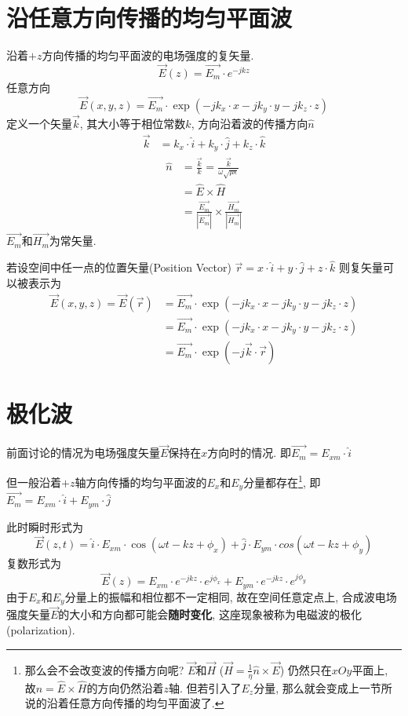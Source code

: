 \documentclass[a4paper]{report}
\begin{document}
\section{沿任意方向传播的均匀平面波}
沿着$+z$方向传播的均匀平面波的电场强度的复矢量. 
$$\vec{E}(z)=\vec{E _m}\cdot e^{-jkz}  $$
任意方向
$$\vec{E}(x,y,z)=\vec{E _m}\cdot \exp(-jk_x\cdot x-jk_y\cdot y-jk_z\cdot z)  $$
定义一个矢量$\vec{k}$, 其大小等于相位常数$k$, 方向沿着波的传播方向$\hat{n}$
\begin{align*}
    \vec{k}&=k_x\cdot\hat{i} +k_y\cdot \hat{j} +k_z\cdot\hat{k}
\end{align*}
\begin{align*}
    \hat{n}&=\frac{\vec{k}}{k}=\frac{\vec{k}}{\omega\sqrt{\mu\epsilon}}\\
    &=\hat{E}\times\hat{H}\\
    &=\frac{\vec{E_m}}{|\vec{E_m}|} \times \frac{\vec{H_m}}{|\vec{H_m}|}
\end{align*}
$\vec{E_m}$和$\vec{H_m}$为常矢量. 
\par 若设空间中任一点的位置矢量(Position Vector) $\vec{r}=x\cdot\hat{i} +y\cdot \hat{j} +z\cdot\hat{k}$
则复矢量可以被表示为
\begin{align*}
    \vec{E}(x,y,z)=\vec{E}(\vec{r})&=\vec{E _m}\cdot \exp(-jk_x\cdot x-jk_y\cdot y-jk_z\cdot z)\\
    &= \vec{E _m}\cdot \exp(-jk_x\cdot x-jk_y\cdot y-jk_z\cdot z)\\
    &=\vec{E _m}\cdot \exp(-j\vec{k}\cdot\vec{r}) 
\end{align*}
\section{极化波}
前面讨论的情况为电场强度矢量$\vec{E } $保持在$x$方向时的情况. 即$\vec{E _m}=E_{xm}\cdot \hat{i} $ 
\par 但一般沿着$+z$轴方向传播的均匀平面波的$E_x$和$E_y$分量都存在\footnote{那么会不会改变波的传播方向呢? $\vec{E}$和$\vec{H}$ ($\vec{H}=\frac{1}{\eta}\hat{n}\times \vec{E}$) 仍然只在$xOy$平面上, 故$\hat{n}=\hat{E}\times\hat{H}$的方向仍然沿着$z$轴. 但若引入了$E_z$分量, 那么就会变成上一节所说的沿着任意方向传播的均匀平面波了. }, 即$\vec{E _m}=E_{xm}\cdot \hat{i}+E_{ym}\cdot \hat{j}$
\par 此时瞬时形式为
$$\vec{E}(z,t)= \hat{i}\cdot E_{xm}\cdot \cos(\omega t-kz+\phi_x)+\hat{j}\cdot E_{ym}\cdot cos(\omega t-kz+\phi_y)$$
复数形式为
$$\vec{E}(z)=E_{xm}\cdot e^{-jkz}\cdot e^{j\phi_x}+E_{ym}\cdot e^{-jkz}\cdot e^{j\phi_y} $$
由于$E_x$和$E_y$分量上的振幅和相位都不一定相同, 故在空间任意定点上, 合成波电场强度矢量$\vec{E} $的大小和方向都可能会\textbf{随时变化}, 这座现象被称为电磁波的极化 (polarization). 
\end{document}
